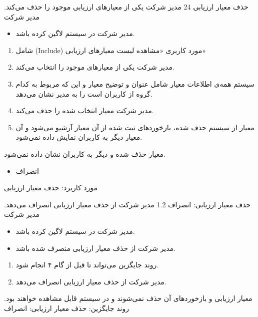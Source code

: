 {
\usecase
{
حذف معیار ارزیابی
}
{24}
{
	مدیر شرکت یکی از معیارهای ارزیابی موجود را حذف می‌کند.
}
{
	مدیر شرکت
}
{}
{
	\begin{itemize}
		\vspace*{-0.6cm}
		\item 
		مدیر شرکت در سیستم لاگین کرده باشد.
	\end{itemize}
}
{
	\begin{enumerate}
	\item 
	شامل (Include) مورد کاربری «مشاهده لیست معیارهای ارزیابی»
	\item
	مدیر شرکت یکی از معیارهای موجود را انتخاب می‌کند.
	\item 
	سیستم همه‌ی اطلاعات معیار شامل عنوان و توضیح معیار و این که مربوط به کدام گروه از کاربران است را به مدیر نشان می‌دهد.
	\item 
 مدیر شرکت معیار انتخاب شده را حذف می‌کند.
	\item 
معیار از سیستم حذف شده، بازخوردهای ثبت شده از آن معیار آرشیو می‌شود و آن معیار دیگر به کاربران نمایش داده نمی‌شود.
\end{enumerate}
}
{
معیار حذف شده و دیگر به کاربران نشان داده نمی‌شود.
}
{
	\begin{itemize}
		\vspace*{-0.6cm}
		\item 
		انصراف
	\end{itemize}
}
{
	مورد کاربرد: حذف معیار ارزیابی
}


	
\alternativeflow
{
حذف معیار ارزیابی: انصراف
}
{1.2}
{
مدیر شرکت از حذف معیار ارزیابی انصراف می‌دهد.
}
{
	مدیر شرکت
}
{}
{
	\begin{itemize}
		\vspace*{-0.6cm}
		\item 
	مدیر شرکت در سیستم لاگین کرده باشد.
	\item
	مدیر شرکت از حذف معیار ارزیابی منصرف شده باشد.
		
	\end{itemize}
}
{
	\vspace*{-0.6cm}
	\begin{enumerate}
		\item 
		روند جایگزین می‌تواند تا قبل از گام ۴ انجام شود.
		\item
مدیر شرکت از حذف معیار ارزیابی انصراف می‌دهد.
	\end{enumerate}
}
{
معیار ارزیابی و بازخوردهای آن حذف نمی‌شوند و در سیستم قابل مشاهده خواهند بود.
}
{
	روند جایگزین: حذف معیار ارزیابی: انصراف
}


}

